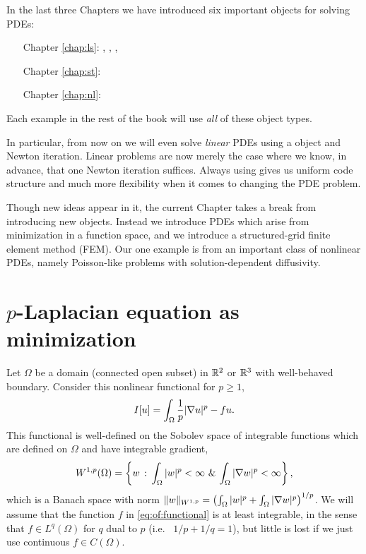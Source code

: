 
In the last three Chapters we have introduced six important \PETSc objects for solving PDEs:
\begin{itemize}
\item[\quad Chapter \ref{chap:ls}:] \pVec, \pMat, \pKSP, \pPC
\item[\quad Chapter \ref{chap:st}:] \pDM{}
\item[\quad Chapter \ref{chap:nl}:] \pSNES
\end{itemize}
Each example in the rest of the book will use \emph{all} of these object types.

In particular, from now on we will even solve \emph{linear} PDEs using a \pSNES object and Newton iteration.  Linear problems are now merely the case where we know, in advance, that one Newton iteration suffices.  Always using \pSNES gives us uniform code structure and much more flexibility when it comes to changing the PDE problem.

Though new ideas appear in it, the current Chapter takes a break from introducing new \PETSc objects.  Instead we introduce PDEs which arise from minimization in a function space, and we introduce a structured-grid finite element method (FEM).  Our one example is from an important class of nonlinear PDEs, namely Poisson-like problems with solution-dependent diffusivity.


\section{$p$-Laplacian equation as minimization}

Let $\Omega$ be a domain (connected open subset) in $\mathbb{R}^2$ or $\mathbb{R}^3$ with well-behaved boundary.  Consider this nonlinear functional for $p \ge 1$,
\begin{equation}
    I[u] = \int_\Omega \frac{1}{p} |\nabla u|^p - fu.  \label{eq:of:functional}
\end{equation}
This functional is well-defined on the Sobolev space \citep{Evans2010} of integrable functions which are defined on $\Omega$ and have integrable gradient,
\begin{equation}
    W^{1,p}(\Omega) = \left\{w \,:\, \int_\Omega |w|^p < \infty \,\, \& \, \int_\Omega |\nabla w|^p < \infty\right\}, \label{eq:of:sobolevdefn}
\end{equation}
which is a Banach space with norm $\|w\|_{W^{1,p}} = \left(\int_\Omega |w|^p + \int_\Omega |\nabla w|^p\right)^{1/p}$.  We will assume that the function $f$ in \eqref{eq:of:functional} is at least integrable, in the sense that $f\in L^q(\Omega)$ for $q$ dual to $p$ (i.e.~ $1/p+1/q=1$), but little is lost if we just use continuous $f\in C(\Omega)$.

